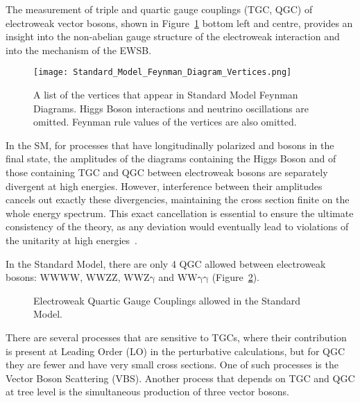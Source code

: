 The measurement of triple and quartic gauge couplings (TGC, QGC) of electroweak vector bosons, shown in Figure~\ref{fig:SMvertices} bottom left and centre, provides an insight into the non-abelian gauge structure of the electroweak interaction and into the mechanism of the EWSB.
%
\begin{figure}
	\centering
	\texttt{[image: Standard\_Model\_Feynman\_Diagram\_Vertices.png]}
	\caption{A list of the vertices that appear in Standard Model Feynman Diagrams. Higgs Boson interactions and neutrino oscillations are omitted. Feynman rule values of the vertices are also omitted.~\cite{wikipedia_SM_feynman_vertices}}
        \label{fig:SMvertices}
\end{figure}

In the SM, for processes that have longitudinally polarized \PW and \PZ bosons in the final state,
the amplitudes of the diagrams containing the Higgs Boson and of those containing TGC and QGC between electroweak bosons are separately divergent at high energies.
However, interference between their amplitudes cancels out exactly these divergencies, maintaining the cross section finite on the whole energy spectrum.
This exact cancellation is essential to ensure the ultimate consistency of the theory, as any deviation would eventually lead to violations of the unitarity at high energies~\cite{PhysRevLett.38.883}.

In the Standard Model, there are only 4 QGC allowed between electroweak bosons: $\mathrm{WWWW}$, $\mathrm{WWZZ}$, $\mathrm{WWZ\gamma}$ and $\mathrm{WW\gamma\gamma}$ (Figure~\ref{fig:EWQGC}).
\begin{figure}[ht]
  \centering
  \caption{Electroweak Quartic Gauge Couplings allowed in the Standard Model.}
  \label{fig:EWQGC}
\end{figure}

There are several processes that are sensitive to TGCs, where their contribution is present at Leading Order (LO) in the perturbative calculations,
but for QGC they are fewer and have very small cross sections.
One of such processes is the Vector Boson Scattering (VBS).
Another process that depends on TGC and QGC at tree level is the simultaneous production of three vector bosons.

